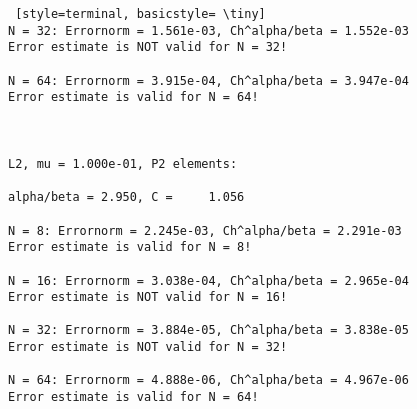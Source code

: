 \documentclass[a4paper,english,12pt,twoside]{article}
\begin{document}
\begin{lstlisting} [style=terminal, basicstyle= \tiny]
N = 32: Errornorm = 1.561e-03, Ch^alpha/beta = 1.552e-03
Error estimate is NOT valid for N = 32!

N = 64: Errornorm = 3.915e-04, Ch^alpha/beta = 3.947e-04
Error estimate is valid for N = 64!



L2, mu = 1.000e-01, P2 elements:

alpha/beta = 2.950, C =     1.056

N = 8: Errornorm = 2.245e-03, Ch^alpha/beta = 2.291e-03
Error estimate is valid for N = 8!

N = 16: Errornorm = 3.038e-04, Ch^alpha/beta = 2.965e-04
Error estimate is NOT valid for N = 16!

N = 32: Errornorm = 3.884e-05, Ch^alpha/beta = 3.838e-05
Error estimate is NOT valid for N = 32!

N = 64: Errornorm = 4.888e-06, Ch^alpha/beta = 4.967e-06
Error estimate is valid for N = 64!

\end{lstlisting}
\newpage
\end{document}
